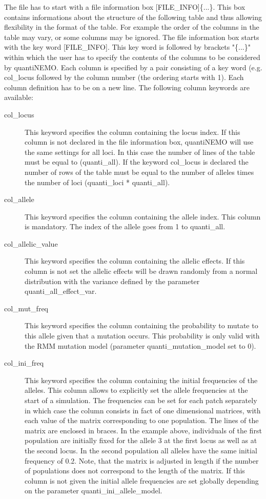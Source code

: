 \documentclass[letterpaper,12pt,oneside]{book}
\begin{document}
\begin{description}
The file has to start with a file information box \textsf{[FILE\_INFO]}\{...\}. 
This box contains informations about the structure of the following table and thus allowing flexibility in the format of the table. For example the order of the columns in the table may vary, or some columns may be ignored. The file information box starts with the key word \textsf{[FILE\_INFO]}. This key word is followed by brackets "\{...\}" within which the user has to specify the contents of the columns to be considered by quantiNEMO. Each column is specified by a pair consisting of a key word (e.g. \textsf{col\_locus} followed by the column number (the ordering starts with 1). Each column definition has to be on a new line. The following column keywords are available:
\begin{description}
\item [col\_locus] This keyword specifies the column containing the locus index. If this column is not declared in the file information box, quantiNEMO will use the same settings for all loci. In this case the number of lines of the table must be equal to (\textsf{quanti\_all}). If the keyword \textsf{col\_locus} is declared the number of rows of the table must be equal to the number of alleles times the number of loci (\textsf{quanti\_loci} * \textsf{quanti\_all}).   
\item [col\_allele] This keyword specifies the column containing the allele index. This column is mandatory. The index of the allele goes from 1 to \textsf{quanti\_all}.
\item [col\_allelic\_value] This keyword specifies the column containing the allelic effects. If this column is not set the allelic effects will be drawn randomly from a normal distribution with the variance defined by the parameter \textsf{quanti\_all\_effect\_var}.
\item [col\_mut\_freq] This keyword specifies the column containing the probability to mutate to this allele given that a mutation occurs. This probability is only valid with the RMM mutation model (parameter \textsf{quanti\_mutation\_model} set to 0).
\item [col\_ini\_freq] This keyword specifies the column containing the initial frequencies of the alleles. This column allows to explicitly set the allele frequencies at the start of a simulation. The frequencies can be set for each patch separately in which case the column consists in fact of one dimensional matrices, with each value of the matrix corresponding to one population. The lines of the matrix are enclosed in braces. In the example above, individuals of the first population are initially fixed for the allele 3 at the first locus as well as at the second locus. In the second population all alleles have the same initial frequency of 0.2. Note, that the matrix is adjusted in length if the number of populations does not correspond to the length of the matrix. If this column is not given the initial allele frequencies are set globally depending on the parameter \textsf{quanti\_ini\_allele\_model}.

\end{description}
\end{description}
\end{document}
